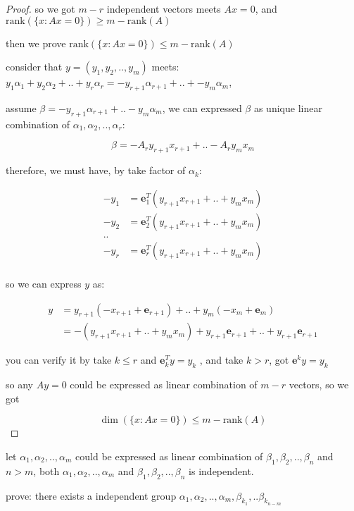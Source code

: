 \begin{proof}
    so we got $m-r$ independent vectors meets $Ax = 0$, and $\mathrm{rank}(\{x: Ax = 0\}) \ge m - \mathrm{rank}(A)$

    then we prove $\mathrm{rank}(\{x: Ax = 0\}) \le m - \mathrm{rank}(A)$

    consider that $y =(y_1,y_2, ..,y_m)$ meets: $y_1\alpha_1 + y_2\alpha_2 + .. + y_r\alpha_r = -y_{r+1}\alpha_{r+1}+ .. + -y_m \alpha_m$, 

    assume $\beta= -y_{r+1}\alpha_{r+1}+ .. - y_m \alpha_m$, we can expressed $\beta$ as unique linear combination of $\alpha_1, \alpha_2, .., \alpha_r$:

    \[
        \beta = -A_ry_{r+1}x_{r+1} + .. - A_ry_{m}x_{m}
    \]

    therefore, we must have, by take factor of $\alpha_k$:

    \begin{align*}
        -y_1 &= \mathbf{e}_1^T (y_{r+1}x_{r+1} + .. + y_{m}x_{m}) \\
        -y_2 &= \mathbf{e}_2^T (y_{r+1}x_{r+1} + .. + y_{m}x_{m}) \\
        .. \\
        -y_r &= \mathbf{e}_r^T (y_{r+1}x_{r+1} + .. + y_{m}x_{m}) \\
    \end{align*}

    so we can express $y$ as:

    \begin{align*}
        y &= y_{r+1}(-x_{r+1} + \mathbf{e}_{r+1}) + .. + y_{m}(-x_{m} + \mathbf{e}_{m}) \\
        &= -(y_{r+1}x_{r+1} + .. + y_m x_m) + y_{r+1}\mathbf{e}_{r+1} + .. +y_{r+1}\mathbf{e}_{r+1}
    \end{align*}

    you can verify it by take $k \le r$ and $\mathbf{e}_k^T y = y_k$ , and take $k > r$, got
    $\mathbf{e}^k y = y_k$

    so any $Ay = 0$ could be expressed as linear combination of $m-r$ vectors, 
    so we got

    \[
        \dim(\{ x: Ax = 0\}) \le m - \mathrm{rank}(A)
    \]
\end{proof}

\begin{exercise}
    let $\alpha_1, \alpha_2, .., \alpha_m$ could be expressed as linear combination of 
    $\beta_1, \beta_2, .., \beta_n$ and $n > m$, both $\alpha_1, \alpha_2, .., \alpha_m$ 
    and $\beta_1, \beta_2, .., \beta_n$ is independent.

    prove: there exists a independent group $\alpha_1, \alpha_2, .., \alpha_m, \beta_{k_1}, .. \beta_{k_{n-m}}$
\end{exercise}

